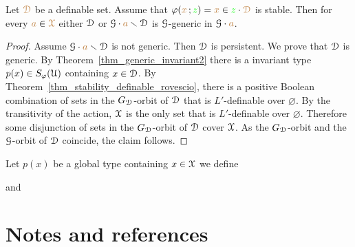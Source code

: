 \begin{theorem}
  Let ${\color{brown}\EuScript D}$ be a definable set.
  Assume that $\varphi({\color{brown} x}\,;{\color{green} z})={\color{brown} x}\in{\color{green}z}\cdot{\color{brown}\EuScript D}$ is stable.
  Then for every ${\color{brown} a}\in{\color{brown}\EuScript X}$ either $\EuScript D$ or $\EuScript G\cdot{\color{brown}a}\smallsetminus\EuScript D$ is $\EuScript G$-generic in $\EuScript G\cdot{\color{brown}a}$.
\end{theorem}

\begin{proof}
  Assume $\EuScript G\cdot{\color{brown}a}\smallsetminus\EuScript D$ is not generic.
  Then $\EuScript D$ is persistent.
  We prove that $\EuScript D$ is generic.
  By Theorem~\ref{thm_generic_invariant2} there is a invariant type $p(x)\in S_\varphi(\EuScript U)$ containing $x\in\EuScript D$.
  By Theorem~\ref{thm_stability_definable_rovescio}, there is a positive Boolean combination of sets in the $G_{\EuScript D}$-orbit of $\EuScript D$ that is $L'$-definable over $\varnothing$.
  By the transitivity of the action, $\EuScript X$ is the only set that is $L'$-definable over $\varnothing$.
  Therefore some disjunction of sets in the $G_{\EuScript D}$-orbit of $\EuScript D$ cover $\EuScript X$.
  As the $G_{\EuScript D}$-orbit and the $\EuScript G$-orbit of $\EuScript D$ coincide, the claim follows.
\end{proof}

Let $p(x)$ be a global type containing $x\in\EuScript X$ we define


and




\section{Notes and references}
\begin{biblist}[]\normalsize
{}\smallskip
  \smallskip
{}\smallskip
\end{biblist}